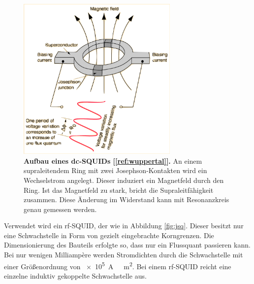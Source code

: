 \documentclass[a4paper,ngerman]{scrartcl}
\begin{document}
\begin{figure}[tb!]
\centering
\includegraphics[width=0.7\textwidth]{abbildungen/squide.png}
\caption[Versuchsplatz]{\textbf{Aufbau eines dc-SQUIDs [\ref{ref:wuppertal}].} An einem supraleitendem Ring mit zwei Josephson-Kontakten wird ein Wechselstrom angelegt. 
Dieser induziert ein Magnetfeld durch den Ring. 
Ist das Magnetfeld zu stark, bricht die Supraleitfähigkeit zusammen.
Diese Änderung im Widerstand kann mit Resonanzkreis genau gemessen werden.}
\label{fig:squid_wuppertal}
\end{figure}

Verwendet wird ein rf-SQUID, der wie in Abbildung \ref{fig:jsq}. 
Dieser besitzt nur eine Schwachstelle in Form von gezielt eingebrachte Korngrenzen.
Die Dimensionierung des Bauteils erfolgte so, dass nur ein Flussquant passieren kann.
Bei nur wenigen Milliampère werden Stromdichten durch die Schwachstelle mit einer Größenordnung von \SI{e5}{A \per  \centi \square \meter}.
Bei einem rf-SQUID reicht eine einzelne induktiv gekoppelte Schwachstelle aus.
\end{document}
